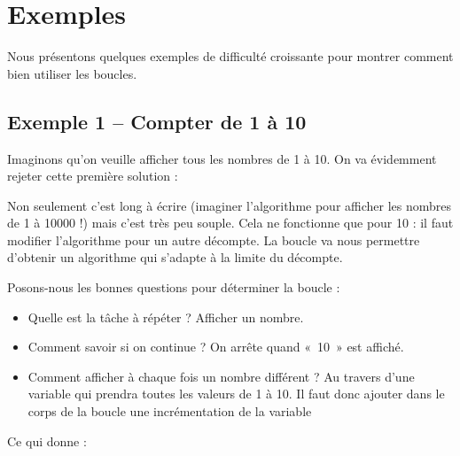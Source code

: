 \section{Exemples}

	Nous présentons quelques exemples de difficulté
	croissante pour montrer comment bien utiliser les boucles.

	\subsection{Exemple 1 -- Compter de 1 à 10}

		Imaginons qu'on veuille afficher tous les nombres de 1 à 10. 
		On va évidemment rejeter cette première solution :


		Non seulement c'est long à écrire 
		(imaginer l'algorithme pour afficher les nombres de 1 à 10000 !) 
		mais c'est très peu souple.
		Cela ne fonctionne que pour 10 : il faut modifier l'algorithme pour
		un autre décompte. La boucle va nous permettre
		d'obtenir un algorithme qui s'adapte
		à la limite du décompte.

		Posons-nous les bonnes questions pour déterminer la boucle :

		\begin{itemize}
		\item 
			Quelle est la tâche à répéter ? Afficher un nombre.
		\item 
			Comment savoir si on continue ? On arrête quand «~10~» est affiché.
		\item 
			Comment afficher à chaque fois un nombre différent ? 
			Au travers d'une variable qui prendra toutes les valeurs de 1 à 10. 
			Il faut donc ajouter dans le corps de la
			boucle une incrémentation de la variable
		\end{itemize}

		Ce qui donne :


